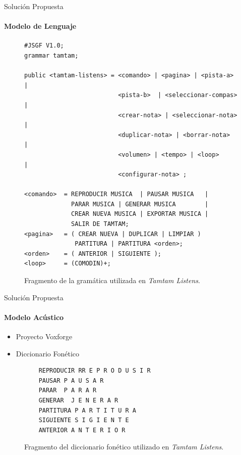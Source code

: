 \begin{frame}[fragile]{Soluci\'on Propuesta}
\framesubtitle{Modelo de Lenguaje}
\begin{figure}[H]
\lstset{basicstyle=\ttfamily\scriptsize}
\begin{lstlisting}
#JSGF V1.0;
grammar tamtam;

public <tamtam-listens> = <comando> | <pagina> | <pista-a>  |
                          <pista-b>  | <seleccionar-compas> | 
                          <crear-nota> | <seleccionar-nota> | 
                          <duplicar-nota> | <borrar-nota>   | 
                          <volumen> | <tempo> | <loop>      |
                          <configurar-nota> ;

<comando>  = REPRODUCIR MUSICA  | PAUSAR MUSICA   |
             PARAR MUSICA | GENERAR MUSICA        | 
             CREAR NUEVA MUSICA | EXPORTAR MUSICA | 
             SALIR DE TAMTAM;
<pagina>   = ( CREAR NUEVA | DUPLICAR | LIMPIAR ) 
              PARTITURA | PARTITURA <orden>;
<orden>    = ( ANTERIOR | SIGUIENTE );
<loop>     = (COMODIN)+;
\end{lstlisting}
\caption{Fragmento de la gram\'atica utilizada en \emph{Tamtam Listens}.}
\label{figure:fragmento-gram}
\end{figure} 
\end{frame}

\begin{frame}[fragile]{Soluci\'on Propuesta}
\framesubtitle{Modelo Acústico}
\begin{itemize}
    \item Proyecto Voxforge
    \item Diccionario Fonético    
\end{itemize}

    \begin{figure}[H]
    \begin{lstlisting}
    REPRODUCIR RR E P R O D U S I R
    PAUSAR P A U S A R
    PARAR  P A R A R
    GENERAR  J E N E R A R
    PARTITURA P A R T I T U R A
    SIGUIENTE S I G I E N T E
    ANTERIOR A N T E R I O R
    \end{lstlisting}
    \caption{Fragmento del diccionario fon\'etico utilizado en \emph{Tamtam Listens}.}
    \label{figure:fragmento-dic}
\end{figure}

\end{frame}

